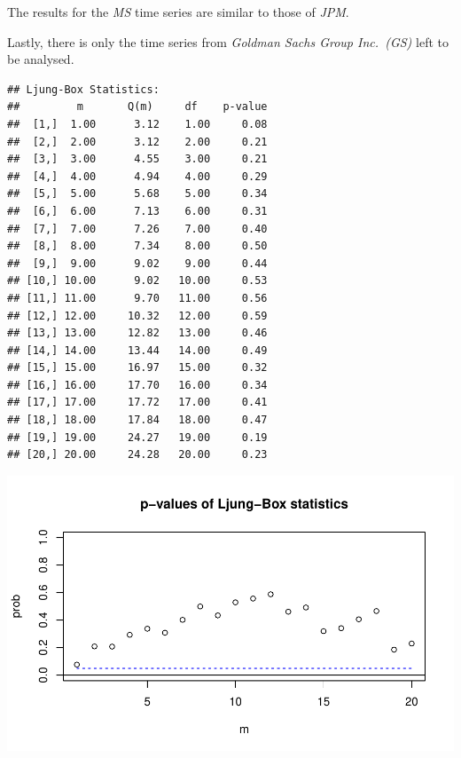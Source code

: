 \documentclass[12pt,a4paper]{article}
\newenvironment{Shaded}{\begin{snugshade}}{\end{snugshade}}
\newcommand{\DataTypeTok}[1]{\textcolor[rgb]{0.13,0.29,0.53}{#1}}
\newcommand{\DecValTok}[1]{\textcolor[rgb]{0.00,0.00,0.81}{#1}}
\newcommand{\KeywordTok}[1]{\textcolor[rgb]{0.13,0.29,0.53}{\textbf{#1}}}
\newcommand{\NormalTok}[1]{#1}
\newcommand{\OperatorTok}[1]{\textcolor[rgb]{0.81,0.36,0.00}{\textbf{#1}}}
\begin{document}
The results for the \emph{MS} time series are similar to those of
\emph{JPM}.

Lastly, there is only the time series from \emph{Goldman Sachs Group
Inc.~(GS)} left to be analysed.

\begin{Shaded}
\end{Shaded}

\begin{verbatim}
## Ljung-Box Statistics:  
##         m       Q(m)     df    p-value
##  [1,]  1.00      3.12    1.00     0.08
##  [2,]  2.00      3.12    2.00     0.21
##  [3,]  3.00      4.55    3.00     0.21
##  [4,]  4.00      4.94    4.00     0.29
##  [5,]  5.00      5.68    5.00     0.34
##  [6,]  6.00      7.13    6.00     0.31
##  [7,]  7.00      7.26    7.00     0.40
##  [8,]  8.00      7.34    8.00     0.50
##  [9,]  9.00      9.02    9.00     0.44
## [10,] 10.00      9.02   10.00     0.53
## [11,] 11.00      9.70   11.00     0.56
## [12,] 12.00     10.32   12.00     0.59
## [13,] 13.00     12.82   13.00     0.46
## [14,] 14.00     13.44   14.00     0.49
## [15,] 15.00     16.97   15.00     0.32
## [16,] 16.00     17.70   16.00     0.34
## [17,] 17.00     17.72   17.00     0.41
## [18,] 18.00     17.84   18.00     0.47
## [19,] 19.00     24.27   19.00     0.19
## [20,] 20.00     24.28   20.00     0.23
\end{verbatim}

\includegraphics{exercise_1_files/figure-latex/unnamed-chunk-5-1.pdf}
\end{document}
